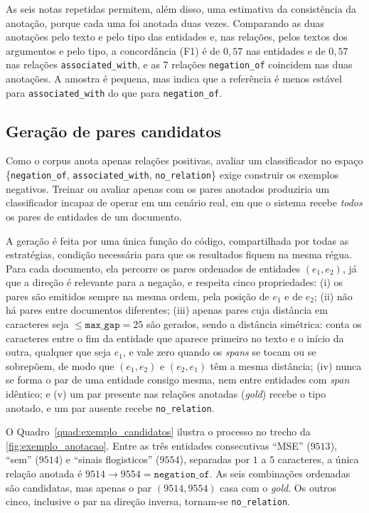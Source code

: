 As seis notas repetidas permitem, além disso, uma estimativa da consistência da
anotação, porque cada uma foi anotada duas vezes. Comparando as duas anotações pelo
texto e pelo tipo das entidades e, nas relações, pelos textos dos argumentos e pelo
tipo, a concordância (F1) é de $0{,}57$ nas entidades e de $0{,}57$ nas relações
\texttt{associated\_with}, e as $7$ relações \texttt{negation\_of} coincidem nas duas
anotações. A amostra é pequena, mas indica que a referência é menos estável para
\texttt{associated\_with} do que para \texttt{negation\_of}.



\subsection{Geração de pares candidatos}
\label{sec:candidatos}

Como o corpus anota apenas relações positivas, avaliar um classificador no espaço
\{\texttt{negation\_of}, \texttt{associated\_with}, \texttt{no\_relation}\} exige
construir os exemplos negativos. Treinar ou avaliar apenas com os pares
anotados produziria um classificador incapaz de operar em um cenário real, em que o
sistema recebe \emph{todos} os pares de entidades de um documento.

A geração é feita por uma única função do código, compartilhada por todas as
estratégias, condição necessária para que os resultados fiquem na mesma régua. Para
cada documento, ela percorre os pares ordenados de entidades $(e_1, e_2)$,
já que a direção é relevante para a negação, e respeita cinco propriedades:
(i) os pares são emitidos sempre na mesma ordem, pela posição de $e_1$ e de $e_2$;
(ii) não há pares entre documentos diferentes; (iii) apenas pares cuja distância em
caracteres seja $\leq \texttt{max\_gap}=25$ são gerados, sendo a distância
simétrica: conta os caracteres entre o fim da entidade que aparece primeiro no texto e
o início da outra, qualquer que seja $e_1$, e vale zero quando os \emph{spans} se
tocam ou se sobrepõem, de modo que $(e_1, e_2)$ e $(e_2, e_1)$ têm a mesma distância;
(iv) nunca se forma o par de uma entidade
consigo mesma, nem entre entidades com \emph{span} idêntico; e (v) um par presente
nas relações anotadas (\emph{gold}) recebe o tipo anotado, e um par ausente recebe
\texttt{no\_relation}.

O Quadro~\ref{quad:exemplo_candidatos} ilustra o processo no trecho da
\autoref{fig:exemplo_anotacao}. Entre as três entidades consecutivas ``MSE''
($9513$), ``sem'' ($9514$) e ``sinais flogisticos'' ($9554$), separadas por $1$ a
$5$ caracteres, a única relação anotada é $9514 \rightarrow 9554 =
\texttt{negation\_of}$. As seis combinações ordenadas são candidatas, mas apenas o par
$(9514, 9554)$ casa com o \emph{gold}. Os outros cinco, inclusive o par na direção
inversa, tornam-se \texttt{no\_relation}.


